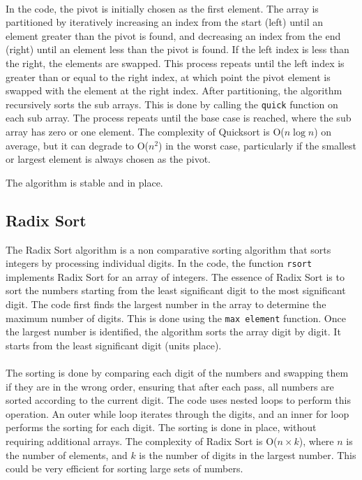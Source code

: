 \documentclass{article}
\begin{document}
\paragraph{}
In the code, the pivot is initially chosen as the first element. 
The array is partitioned by iteratively increasing an index from the start (left) until an element greater than the pivot is found, and decreasing an index from the end (right) until an element less than the pivot is found. 
If the left index is less than the right, the elements are swapped. 
This process repeats until the left index is greater than or equal to the right index, at which point the pivot element is swapped with the element at the right index.
After partitioning, the algorithm recursively sorts the sub arrays. 
This is done by calling the \texttt{quick} function on each sub array. 
The process repeats until the base case is reached, where the sub array has zero or one element.
The complexity of Quicksort is O($n\log n$) on average, but it can degrade to O($n^2$) in the worst case, particularly if the smallest or largest element is always chosen as the pivot.

The algorithm is stable and in place.

\subsection{Radix Sort}
The Radix Sort algorithm is a non comparative sorting algorithm that sorts integers by processing individual digits. 
In the code, the function \texttt{rsort} implements Radix Sort for an array of integers.
The essence of Radix Sort is to sort the numbers starting from the least significant digit to the most significant digit. 
The code first finds the largest number in the array to determine the maximum number of digits. 
This is done using the \texttt{max element} function.
Once the largest number is identified, the algorithm sorts the array digit by digit. 
It starts from the least significant digit (units place). 
\paragraph{}
The sorting is done by comparing each digit of the numbers and swapping them if they are in the wrong order, ensuring that after each pass, all numbers are sorted according to the current digit.
The code uses nested loops to perform this operation. 
An outer while loop iterates through the digits, and an inner for loop performs the sorting for each digit. 
The sorting is done in place, without requiring additional arrays.
The complexity of Radix Sort is O($n \times k$), where $n$ is the number of elements, and $k$ is the number of digits in the largest number.
This could be very efficient for sorting large sets of numbers.
\end{document}
